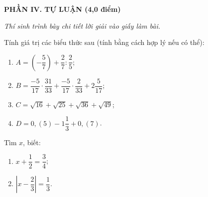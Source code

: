 \documentclass[12pt,a4paper]{article}
\begin{document}
\newpage
\setcounter{ex}{0}
\noindent\textbf{\large PHẦN IV. TỰ LUẬN (4,0 điểm)}

\textit{Thí sinh trình bày chi tiết lời giải vào giấy làm bài.}

\vspace{1mm}
\begin{ex}
Tính giá trị các biểu thức sau (tính bằng cách hợp lý nếu có thể):
\begin{enumerate}[label=\textbf{\alph*)}, leftmargin=0.8cm, itemsep=1pt]
\item $A = \left(-\dfrac{5}{7}\right) + \dfrac{2}{7} : \dfrac{2}{5}$;
\item $B = \dfrac{-5}{17} \cdot \dfrac{31}{33} + \dfrac{-5}{17} \cdot \dfrac{2}{33} + 2\dfrac{5}{17}$;
\item $C = \sqrt{16} + \sqrt{25} + \sqrt{36} + \sqrt{49}$;
\item $D = 0{,}(5) - 1\dfrac{1}{3} + 0{,}(7)$.
\end{enumerate}
\end{ex}
\vspace{2mm}

\begin{ex}
Tìm $x$, biết:
\begin{enumerate}[label=\textbf{\alph*)}, leftmargin=0.8cm, itemsep=1pt]
\item $x + \dfrac{1}{2} = \dfrac{3}{4}$;
\item $\left|x - \dfrac{2}{3}\right| = \dfrac{1}{3}$.
\end{enumerate}
\end{ex}
\vspace{2mm}
\end{document}
